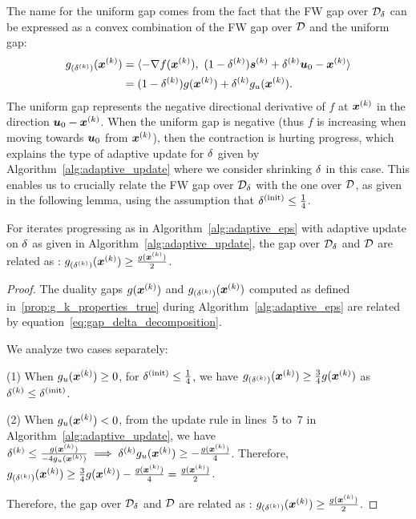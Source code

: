 The name for the uniform gap comes from the fact that the FW gap over $\mathcal{D}_{\delta}$ can be expressed as a convex combination of the FW gap over $\mathcal{D}$ and the uniform gap:
\begin{align}
g_{(\delta^{(k)})}(\bm{x}^{(k)}) &=  \langle-\nabla f(\bm{x}^{(k)}), \,\, (1-\delta^{(k)}) \bm{s}^{(k)} + \delta^{(k)} \bm{u}_0-\bm{x}^{(k)}\rangle \nonumber \\
		  &=  (1-\delta^{(k)})g(\bm{x}^{(k)}) + \delta^{(k)} g_u(\bm{x}^{(k)}). \label{eq:gap_delta_decomposition}
\end{align}
The uniform gap represents the negative directional derivative of $f$ at $\bm{x}^{(k)}$ in the direction $\bm{u}_0 - \bm{x}^{(k)}$. When the uniform gap is negative (thus $f$ is increasing when moving towards $\bm{u}_0$ from $\bm{x}^{(k)}$), then the contraction is hurting progress, which explains the type of adaptive update for $\delta$ given by Algorithm~\ref{alg:adaptive_update} where we consider shrinking $\delta$ in this case. This enables us to crucially relate the FW gap over $\mathcal{D}_{\delta}$ with the one over $\mathcal{D}$, as given in the following lemma, using the assumption that $\delta^{(\mathrm{init})} \leq \frac{1}{4}$.
\begin{lemma}
	\label{prop:g_k_properties_adaptive}
	For iterates progressing as in Algorithm~\ref{alg:adaptive_eps} with adaptive update on $\delta$ as given in Algorithm~\ref{alg:adaptive_update}, the gap over $\mathcal{D}_{\delta}$ and $\mathcal{D}$ are related as : $g_{(\delta^{(k)})}(\bm{x}^{(k)})\geq\frac{g(\bm{x}^{(k)})}{2}$.
\end{lemma}
\begin{proof}
	The duality gaps $g(\bm{x}^{(k)})$ and $g_{(\delta^{(k)})}(\bm{x}^{(k)})$ computed as defined in~\eqref{prop:g_k_properties_true} during Algorithm~\ref{alg:adaptive_eps} are related by equation~\eqref{eq:gap_delta_decomposition}.
	
We analyze two cases separately:

(1)	When $g_u(\bm{x}^{(k)})\geq 0$, for $\delta^{(\mathrm{init})}\leq\frac{1}{4}$, we have $g_{(\delta^{(k)})}(\bm{x}^{(k)}) \geq \frac{3}{4}g(\bm{x}^{(k)})$ as $\delta^{(k)} \leq \delta^{(\mathrm{init})}$.

(2)	When $g_u(\bm{x}^{(k)}) <0$, from the update rule in lines~5 to~7 in Algorithm~\ref{alg:adaptive_update}, we have
	$\delta^{(k)}\leq \frac{g(\bm{x}^{(k)})}{-4g_u(\bm{x}^{(k)})}\implies \delta^{(k)}g_u(\bm{x}^{(k)})\geq-\frac{g(\bm{x}^{(k)})}{4}$. Therefore, $g_{(\delta^{(k)})}(\bm{x}^{(k)}) \geq \frac{3}{4}g(\bm{x}^{(k)})-\frac{g(\bm{x}^{(k)})}{4}  = \frac{g(\bm{x}^{(k)})}{2}$.

Therefore, the gap over $\mathcal{D}_{\delta}$ and $\mathcal{D}$ are related as : $g_{(\delta^{(k)})}(\bm{x}^{(k)})\geq\frac{g(\bm{x}^{(k)})}{2}$.
\end{proof}

